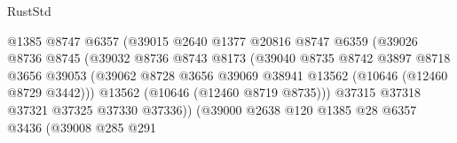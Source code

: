 \begin{lexlean}{RustStd}
\begin{coremodule}
                                          @1385
                                          @8747
                                          @6357
                                          (@39015
                                            @2640
                                            @1377
                                            @20816
                                            @8747
                                            @6359
                                            (@39026
                                              @8736
                                              @8745
                                              (@39032
                                                @8736
                                                @8743
                                                @8173
                                                (@39040
                                                  @8735
                                                  @8742
                                                  @3897
                                                  @8718
                                                  @3656
                                                  @39053
                                                  (@39062
                                                    @8728
                                                    @3656
                                                    @39069
                                                    @38941
                                                    @13562
                                                    (@10646 (@12460 @8729 @3442)))
                                                  @13562
                                                  (@10646 (@12460 @8719 @8735)))
                                                @37315
                                                @37318
                                                @37321
                                                @37325
                                                @37330
                                                @37336))
                                            (@39000
                                              @2638
                                              @120
                                              @1385
                                              @28
                                              @6357
                                              @3436
                                              (@39008
                                                @285
                                                @291

\end{coremodule}
\end{lexlean}
